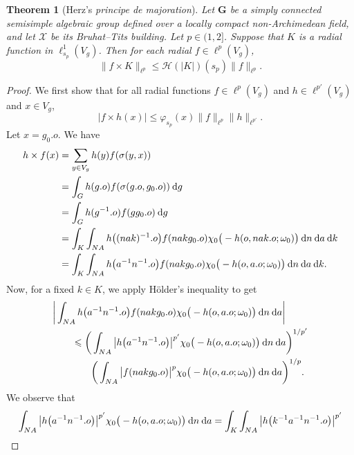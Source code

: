 \documentclass[11pt]{amsart}
\newcommand{\calH}{\mathcal{H}}
\newcommand{\scrX}{\mathscr{X}}
\newcommand{\vphi}{\varphi}
\theoremstyle{plain}
\newcounter{thm}
\newtheorem{theorem}{Theorem}[section]
\theoremstyle{definition}
\numberwithin{equation}{section}
\begin{document}
\begin{theorem}[Herz's \emph{principe de majoration}]
	\label{thm:A:2}
	Let $\mathbf{G}$ be a simply connected semisimple algebraic group defined over a locally compact non-Archimedean field,
	and let $\scrX$ be its Bruhat--Tits building. Let $p \in (1, 2]$. Suppose that $K$ is a radial function in 
	$\ell^1_{s_p}(V_g)$. Then for each radial $f \in \ell^p(V_g)$,
	\[
		\|f \times K\|_{\ell^p} \leqslant \calH (|K|)(s_p) \|f\|_{\ell^p}.
	\]
\end{theorem}
\begin{proof}
	We first show that for all radial functions $f \in \ell^p(V_g)$ and $h \in \ell^{p'}(V_g)$ and $x \in V_g$,
	\begin{equation}
		\label{eq:76}
		|f \times h(x)| \leqslant \vphi_{s_p}(x) \|f\|_{\ell^p} \|h\|_{\ell^{p'}}.
	\end{equation}
	Let $x = g_0 . o$. We have
	\begin{align*}
		h \times f (x) 
		&= \sum_{y \in V_g} h(y) f(\sigma(y, x)) \\
		&= \int_G h(g.o) f(\sigma(g.o, g_0.o)) {\: \rm d} g\\
		&= \int_G h(g^{-1}.o) f(g g_0.o) {\: \rm d} g\\
		&= \int_K \int_{N A} h\big((nak)^{-1}.o\big) f(nak g_0.o) 
		\chi_0\big(-h(o, nak.o; \omega_0)\big) {\: \rm d} n {\: \rm d} a {\: \rm d} k \\
		&= \int_K \int_{N A} h\big(a^{-1}n^{-1}.o\big) f(nak g_0.o) 
		\chi_0\big(-h(o, a.o; \omega_0)\big) {\: \rm d} n {\: \rm d} a {\: \rm d} k.
	\end{align*}
	Now, for a fixed $k \in K$, we apply H\"older's inequality to get
	\begin{align*}
		&
		\bigg|
		\int_{N A} h\big(a^{-1}n^{-1}.o\big) f(nak g_0.o)
		\chi_0\big(-h(o, a.o; \omega_0)\big) {\: \rm d} n {\: \rm d} a
		\bigg| \\
		&\qquad\leqslant
		\bigg(\int_{N A} \big|h\big(a^{-1}n^{-1}.o\big)\big|^{p'} 
		\chi_0\big(-h(o, a.o; \omega_0)\big) {\: \rm d} n {\: \rm d} a \bigg)^{1/{p'}} \\
		&\qquad\qquad
		\bigg(
		\int_{N A} \big| f(nak g_0.o) \big|^p
		\chi_0\big(-h(o, a.o; \omega_0)\big) {\: \rm d} n {\: \rm d} a
		\bigg)^{1/p}.
	\end{align*}
	We observe that
	\begin{align*}
		\int_{N A} \big|h\big(a^{-1}n^{-1}.o\big)\big|^{p'} 
		\chi_0\big(-h(o, a.o; \omega_0)\big) {\: \rm d} n {\: \rm d} a
		=
		\int_K \int_{N A} \big|h\big(k^{-1} a^{-1}n^{-1}.o\big)\big|^{p'}

\end{align*}
\end{proof}
\end{document}
